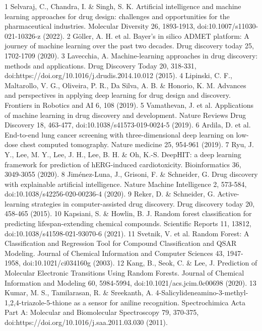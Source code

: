 1	Selvaraj, C., Chandra, I. \& Singh, S. K. Artificial intelligence and machine learning approaches for drug design: challenges and opportunities for the pharmaceutical industries. Molecular Diversity 26, 1893-1913, doi:10.1007/s11030-021-10326-z (2022).
2	Göller, A. H. et al. Bayer’s in silico ADMET platform: A journey of machine learning over the past two decades. Drug discovery today 25, 1702-1709 (2020).
3	Lavecchia, A. Machine-learning approaches in drug discovery: methods and applications. Drug Discovery Today 20, 318-331, doi:https://doi.org/10.1016/j.drudis.2014.10.012 (2015).
4	Lipinski, C. F., Maltarollo, V. G., Oliveira, P. R., Da Silva, A. B. \& Honorio, K. M. Advances and perspectives in applying deep learning for drug design and discovery. Frontiers in Robotics and AI 6, 108 (2019).
5	Vamathevan, J. et al. Applications of machine learning in drug discovery and development. Nature Reviews Drug Discovery 18, 463-477, doi:10.1038/s41573-019-0024-5 (2019).
6	Ardila, D. et al. End-to-end lung cancer screening with three-dimensional deep learning on low-dose chest computed tomography. Nature medicine 25, 954-961 (2019).
7	Ryu, J. Y., Lee, M. Y., Lee, J. H., Lee, B. H. \& Oh, K.-S. DeepHIT: a deep learning framework for prediction of hERG-induced cardiotoxicity. Bioinformatics 36, 3049-3055 (2020).
8	Jiménez-Luna, J., Grisoni, F. \& Schneider, G. Drug discovery with explainable artificial intelligence. Nature Machine Intelligence 2, 573-584, doi:10.1038/s42256-020-00236-4 (2020).
9	Reker, D. \& Schneider, G. Active-learning strategies in computer-assisted drug discovery. Drug discovery today 20, 458-465 (2015).
10	Kapsiani, S. \& Howlin, B. J. Random forest classification for predicting lifespan-extending chemical compounds. Scientific Reports 11, 13812, doi:10.1038/s41598-021-93070-6 (2021).
11	Svetnik, V. et al. Random Forest: A Classification and Regression Tool for Compound Classification and QSAR Modeling. Journal of Chemical Information and Computer Sciences 43, 1947-1958, doi:10.1021/ci034160g (2003).
12	Kang, B., Seok, C. \& Lee, J. Prediction of Molecular Electronic Transitions Using Random Forests. Journal of Chemical Information and Modeling 60, 5984-5994, doi:10.1021/acs.jcim.0c00698 (2020).
13	Kumar, M. S., Tamilarasan, R. \& Sreekanth, A. 4-Salicylideneamino-3-methyl-1,2,4-triazole-5-thione as a sensor for aniline recognition. Spectrochimica Acta Part A: Molecular and Biomolecular Spectroscopy 79, 370-375, doi:https://doi.org/10.1016/j.saa.2011.03.030 (2011).

